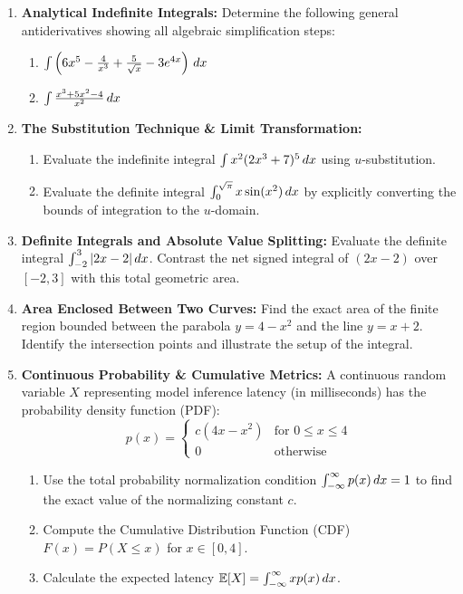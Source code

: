 \begin{enumerate}
    \item \textbf{Analytical Indefinite Integrals:}
    Determine the following general antiderivatives showing all algebraic simplification steps:
    \begin{enumerate}
        \item $\int \left( 6x^5 - \frac{4}{x^3} + \frac{5}{\sqrt{x}} - 3e^{4x} \right) \,dx$
        \item $\int \frac{x^3 + 5x^2 - 4}{x^2} \,dx$
    \end{enumerate}

    \item \textbf{The Substitution Technique \& Limit Transformation:}
    \begin{enumerate}
        \item Evaluate the indefinite integral $\int x^2 (2x^3 + 7)^5 \,dx$ using $u$-substitution.
        \item Evaluate the definite integral $\int_0^{\sqrt{\pi}} x \sin(x^2) \,dx$ by explicitly converting the bounds of integration to the $u$-domain.
    \end{enumerate}

    \item \textbf{Definite Integrals and Absolute Value Splitting:}
    Evaluate the definite integral $\int_{-2}^3 |2x - 2| \,dx$. Contrast the net signed integral of $(2x - 2)$ over $[-2, 3]$ with this total geometric area.

    \item \textbf{Area Enclosed Between Two Curves:}
    Find the exact area of the finite region bounded between the parabola $y = 4 - x^2$ and the line $y = x + 2$. Identify the intersection points and illustrate the setup of the integral.

    \item \textbf{Continuous Probability \& Cumulative Metrics:}
    A continuous random variable $X$ representing model inference latency (in milliseconds) has the probability density function (PDF):
    \begin{equation}
    p(x) = \begin{cases} c(4x - x^2) & \text{for } 0 \le x \le 4 \\ 0 & \text{otherwise} \end{cases}
    \end{equation}
    \begin{enumerate}
        \item Use the total probability normalization condition $\int_{-\infty}^\infty p(x) \,dx = 1$ to find the exact value of the normalizing constant $c$.
        \item Compute the Cumulative Distribution Function (CDF) $F(x) = P(X \le x)$ for $x \in [0, 4]$.
        \item Calculate the expected latency $\mathbb{E}[X] = \int_{-\infty}^\infty x p(x) \,dx$.
    \end{enumerate}
\end{enumerate}

